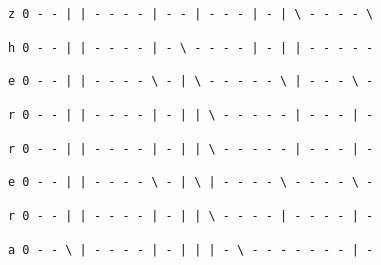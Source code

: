 \documentclass[11pt,a4paper]{article} %
\begin{document}
\texttt{z 0 - - | | - - - - | - - | - - - | - | \textbackslash{ }- - - - \textbackslash{ }}

\texttt{h 0 - - | | - - - - | - \textbackslash{ }- - - - | - | | - - - - -}

\texttt{e 0 - - | | - - - - \textbackslash{ }- | \textbackslash{ }- - - - - \textbackslash{ }| - - - \textbackslash{ }-}

\texttt{r 0 - - | | - - - - | - | | \textbackslash{ }- - - - - | - - - | -}

\texttt{r 0 - - | | - - - - | - | | \textbackslash{ }- - - - - | - - - | -}

\texttt{e 0 - - | | - - - - \textbackslash{ }- | \textbackslash{ }| - - - - \textbackslash{ }- - - - \textbackslash{ }-}

\texttt{r 0 - - | | - - - - | - | | \textbackslash{ }- - - - | - - - - | -}

\texttt{a 0 - - \textbackslash{ }| - - - - | - | | | - \textbackslash{ }- - - - - - - | -}



\normalsize



\end{document}

